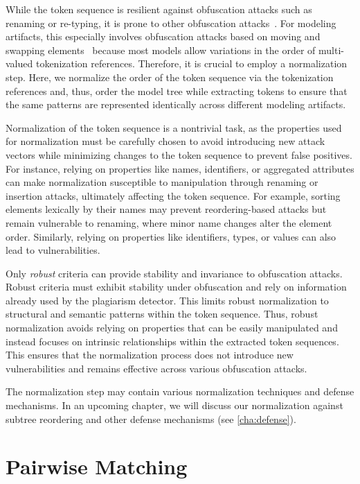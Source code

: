 \noindent
While the token sequence is resilient against obfuscation attacks such as renaming or re-typing, it is prone to other obfuscation attacks~\cite{DevoreMcDonald2020}. For modeling artifacts, this especially involves obfuscation attacks based on moving and swapping elements~\cite{Saglam2022} because most models allow variations in the order of multi-valued tokenization references.
%
Therefore, it is crucial to employ a normalization step.
Here, we normalize the order of the token sequence via the tokenization references and, thus, order the model tree while extracting tokens to ensure that the same patterns are represented identically across different modeling artifacts.

Normalization of the token sequence is a nontrivial task, as the properties used for normalization must be carefully chosen to avoid introducing new attack vectors while minimizing changes to the token sequence to prevent false positives. For instance, relying on properties like names, identifiers, or aggregated attributes can make normalization susceptible to manipulation through renaming or insertion attacks, ultimately affecting the token sequence. For example, sorting elements lexically by their names may prevent reordering-based attacks but remain vulnerable to renaming, where minor name changes alter the element order. Similarly, relying on properties like identifiers, types, or values can also lead to vulnerabilities. 

Only \textit{robust} criteria can provide stability and invariance to obfuscation attacks.
Robust criteria must exhibit stability under obfuscation and rely on information already used by the plagiarism detector. This limits robust normalization to structural and semantic patterns within the token sequence.
Thus, robust normalization avoids relying on properties that can be easily manipulated and instead focuses on intrinsic relationships within the extracted token sequences. This ensures that the normalization process does not introduce new vulnerabilities and remains effective across various obfuscation attacks.

The normalization step may contain various normalization techniques and defense mechanisms. In an upcoming chapter, we will discuss our normalization against subtree reordering and other defense mechanisms (see \autoref{cha:defense}).

\section{Pairwise Matching}
\label{subsec:matching}

